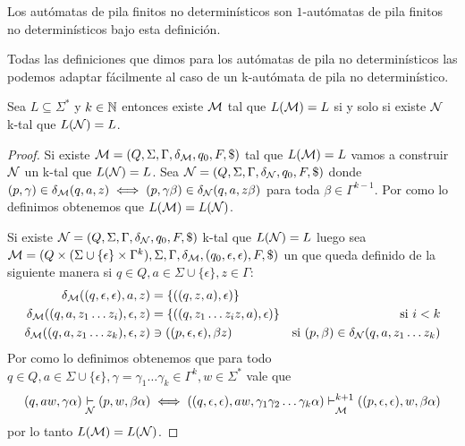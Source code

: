 \documentclass[tesis.tex]{subfiles}
\begin{document}
\smallskip
\begin{obs}
	Los autómatas de pila finitos no determinísticos son $1$-autómatas de pila finitos no determinísticos bajo esta definición.
\end{obs}

Todas las definiciones que dimos para los autómatas de pila no determinísticos las podemos adaptar fácilmente al caso de un k-autómata de pila no determinístico.


\begin{prop}
	\label{prop:equiv_kapnd_apnd}
	Sea $L \subseteq \Sigma^{*}$ y $k \in \mathbb{N}$ entonces existe $\cal M$ \APND tal que $L({\cal M}) =  L$ si y solo si existe ${\cal N}$ k-\APND tal que $L({\cal N}) = L$. 
\end{prop}
\begin{proof}
	Si existe ${\cal M} = (Q, \Sigma, \Gamma, \delta_{\cal M}, q_0, F, \$)$ \APND tal que $L({\cal M}) = L$ vamos a construir $\cal N$ un k-\APND tal que $L({\cal N}) = L$.
	Sea ${\cal N} = (Q, \Sigma, \Gamma, \delta_{\cal N}, q_0, F, \$)$ donde  $(p,\gamma) \in \delta_{\cal M}(q,a,z) \iff (p, \gamma \beta) \in \delta_{\cal N}(q,a,z\beta)$ para toda $\beta \in \Gamma^{k-1}$.
	Por como lo definimos obtenemos que $L({\cal M}) = L({\cal N})$.
	

	Si existe ${\cal N} = (Q, \Sigma, \Gamma, \delta_{\cal N}, q_0, F, \$)$ k-\APND tal que $L({\cal N}) = L$ luego sea ${\cal M} = (Q \times (\Sigma \cup \{ \epsilon \} \times \Gamma^{k}), \Sigma, \Gamma, \delta_{\cal M}, (q_0, \epsilon, \epsilon), F, \$)$ un \APND que queda definido de la siguiente manera si $q \in Q, a \in \Sigma \cup \{ \epsilon \}, z \in \Gamma$:
	\begin{align*}
		\delta_{\cal M} ((q,\epsilon,\epsilon),a,z) &= \{ ((q,z,a),\epsilon) \} 
		& \\
		\delta_{\cal M} ((q,a,z_{1}\dots z_{i}),\epsilon,z) 
		&= \{((q,z_{1}\dots z_{i}z,a),\epsilon)\} 
		& \text{si} \ i < k \\
		\delta_{\cal M} ((q,a,z_{1} \dots z_{k}),\epsilon,z) & \ni ((p,\epsilon,\epsilon),\beta z)
		&\text{si} \  (p,\beta) \in \delta_{\cal N}(q,a,z_{1}\dots z_{k}) 
	\end{align*}
	Por como lo definimos obtenemos que para todo 
	$q \in Q, a \in \Sigma \cup \{ \epsilon \}, \gamma = \gamma_{1} \dots \gamma_{k} \in \Gamma^{k}, w \in \Sigma^{*}$
	vale que 
	\[ 
		(q,aw,\gamma \alpha) \underset{\cal N}{\vdash} (p,w,\beta \alpha) 
		\iff
		((q,\epsilon,\epsilon), aw, \gamma_{1}\gamma_{2}\dots \gamma_{k}\alpha) \underset{\cal M}{\vdash^{k+1}} 
		((p,\epsilon,\epsilon), w, \beta \alpha) 	
	\]
	por lo tanto $L({\cal M}) = L({\cal N})$.
\end{proof}
\end{document}
